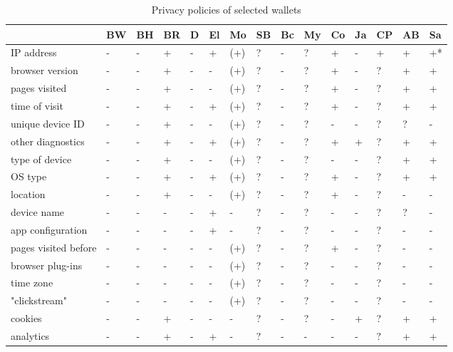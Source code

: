 
\begin{table*}
\normalsize
\caption{Privacy policies of selected wallets}
\centering
\begin{tabular}{| l | l l l l l l l | l l l l l l l |}
	\hline
	& BW & BH & BR & D & El & Mo & SB & Bc & My & Co & Ja & CP & AB & Sa \\
	\hline
	IP address & - & - & + & - & + & (+) & ? & - & ? & + & - & + & + & +* \\
	browser version & - & - & + & - & - & (+) & ? & - & ? & + & - & ? & + & + \\
	pages visited & - & - & + & - & - & (+) & ? & - & ? & + & - & ? & + & + \\
	time of visit & - & - & + & - & + & (+) & ? & - & ? & + & - & ? & + & + \\
	unique device ID & - & - & + & - & - & (+) & ? & - & ? & - & - & ? & ? & - \\
	other diagnostics & - & - & + & - & + & (+) & ? & - & ? & + & + & ? & + & + \\
	type of device & - & - & + & - & - & (+) & ? & - & ? & - & - & ? & + & + \\
	OS type & - & - & + & - & + & (+) & ? & - & ? & + & - & ? & + & + \\
	location & - & - & + & - & - & (+) & ? & - & ? & + & - & ? & - & - \\
	device name & - & - & - & - & + & - & ? & - & ? & - &-  & ? & ? & - \\
	app configuration & - & - & - & - & + & - & ? & - & ? & - & - & ? & - & - \\
	pages visited before & - & - & - & - & - & (+) & ? & - & ? & + & - & ? & - & - \\
	browser plug-ins & - & - & - & - & - & (+) & ? & - & ? & - & - & ? & - & - \\
	time zone & - & - & - & - & - & (+) & ? & - & ? & - & - & ? & - & - \\
	"clickstream" & - & - & - & - & - & (+) & ? & - & ? & - & - & ? & - & - \\
	cookies & - & - & + & - & - & - & ? & - & ? & - & + & ? & + & + \\
	analytics & - & - & + & - & + & - & ? & - & - & - & - & ? & + & + \\

\end{tabular}
\end{table*}

